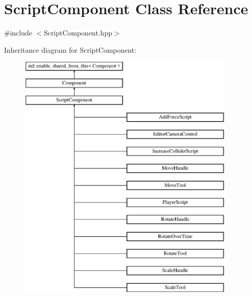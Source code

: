 \hypertarget{class_script_component}{}\section{Script\+Component Class Reference}
\label{class_script_component}


{\ttfamily \#include $<$Script\+Component.\+hpp$>$}

Inheritance diagram for Script\+Component\+:\begin{figure}[H]
\begin{center}
\leavevmode
\includegraphics[height=12.000000cm]{class_script_component}
\end{center}
\end{figure}
